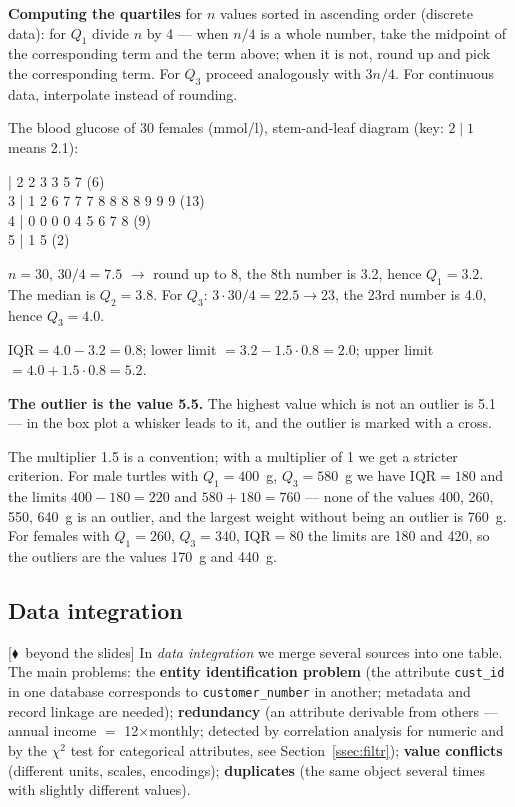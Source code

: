 \documentclass[11pt,a4paper]{article}
\theoremstyle{definition}
\newcommand{\mimo}{\textcolor{markcol}{\textsf{\footnotesize[$\blacklozenge$~beyond the slides]}}}
\begin{document}
\textbf{Computing the quartiles} for $n$ values sorted in ascending order (discrete data): for
$Q_1$ divide $n$ by 4 --- when $n/4$ is a whole number, take the midpoint of the corresponding
term and the term above; when it is not, round up and pick the corresponding term. For $Q_3$
proceed analogously with $3n/4$. For continuous data, interpolate instead of rounding.

\begin{defbox}
The blood glucose of 30 females (mmol/l), stem-and-leaf diagram (key: $2\mid 1$ means 2.1):
\begin{center} | 2 2 3 3 5 7 \hfill (6)\\
3 | 1 2 6 7 7 7 8 8 8 8 9 9 9 \hfill (13)\\
4 | 0 0 0 0 4 5 6 7 8 \hfill (9)\\
5 | 1 5 \hfill (2)
\end{center}
$n=30$, $30/4=7.5$ $\to$ round up to 8, the 8th number is 3.2, hence $Q_1=3.2$. The median is
$Q_2=3.8$. For $Q_3$: $3\cdot 30/4=22.5\to 23$, the 23rd number is 4.0, hence $Q_3=4.0$.

$\mathrm{IQR}=4.0-3.2=0.8$; lower limit $=3.2-1.5\cdot 0.8=2.0$; upper limit
$=4.0+1.5\cdot 0.8=5.2$.

\textbf{The outlier is the value 5.5.} The highest value which is not an outlier is 5.1 --- in
the box plot a whisker leads to it, and the outlier is marked with a cross.
\end{defbox}

The multiplier 1.5 is a convention; with a multiplier of 1 we get a stricter criterion. For male
turtles with $Q_1=400$~g, $Q_3=580$~g we have $\mathrm{IQR}=180$ and the limits
$400-180=220$ and $580+180=760$ --- none of the values 400, 260, 550, 640~g is an outlier, and
the largest weight without being an outlier is 760~g. For females with $Q_1=260$, $Q_3=340$,
$\mathrm{IQR}=80$ the limits are 180 and 420, so the outliers are the values 170~g and 440~g.

\subsection{Data integration}
\label{ssec:integrace}

\mimo{} In \emph{data integration} we merge several sources into one table. The main problems:
the \textbf{entity identification problem} (the attribute \texttt{cust\_id} in one database
corresponds to \texttt{customer\_number} in another; metadata and record linkage are needed);
\textbf{redundancy} (an attribute derivable from others --- annual income $=$ 12$\times$monthly;
detected by correlation analysis for numeric and by the $\chi^2$ test for categorical
attributes, see Section~\ref{ssec:filtr}); \textbf{value conflicts} (different units, scales,
encodings); \textbf{duplicates} (the same object several times with slightly different values).
\end{document}
